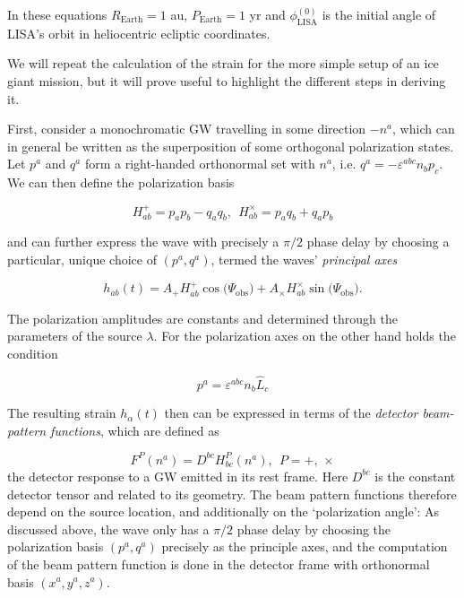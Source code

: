 \documentclass{aa}
\begin{document}
In these equations $R_\mathrm{Earth}=1$ au, $P_\mathrm{Earth} = 1$ yr and $\phi_{\mathrm{LISA}}^{(0)}$ is the initial angle of LISA's orbit in heliocentric ecliptic coordinates.

We will repeat the calculation of the strain for the more simple setup of an ice giant mission, but it will prove useful to highlight the different steps in deriving it.

First, consider a monochromatic GW travelling in some direction $-n^a$, which can in general be written as the superposition of some orthogonal polarization states. Let $p^a$ and $q^a$ form a right-handed orthonormal set with $n^a$, i.e. $q^a=-\varepsilon^{abc}n_bp_c$. We can then define the polarization basis 

\begin{equation} \label{eq:preGWtensor}
    H^+_{ab}=p_ap_b-q_aq_b,\ \ H^\times_{ab}=p_aq_b+q_ap_b
\end{equation}

and can further express the wave with precisely a $\pi/2$ phase delay by choosing a particular, unique choice of $(p^a,q^a)$, termed the waves' \textit{principal axes}

\begin{equation} \label{eq:GWtensor}
    h_{ab}(t)=A_+H_{ab}^+\cos \big(\Psi_\mathrm{obs} \big) + A_\times H_{ab}^\times \sin \big(\Psi_\mathrm{obs}\big).
\end{equation}

The polarization amplitudes are constants and determined through the parameters of the source $\lambda$. For the polarization axes on the other hand holds the condition

\begin{equation}
    p^a = \varepsilon^{abc}n_b\hat{L}_c
\end{equation}

The resulting strain $h_\alpha(t)$ then can be expressed in terms of the \textit{detector beam-pattern functions}, which are defined as

\begin{equation} \label{eq:beampattern}
    F^P(n^a) = D^{bc}H^P_{bc}(n^a), \ \ P=+,\, \times
\end{equation}    
the detector response to a GW emitted in its rest frame. Here $D^{bc}$ is the constant detector tensor and related to its geometry. The beam pattern functions therefore depend on the source location, and additionally on the `polarization angle': As discussed above, the wave only has a $\pi/2$ phase delay by choosing the polarization basis $(p^a,q^a)$ precisely as the principle axes, and the computation of the beam pattern function is done in the detector frame with orthonormal basis $(x^a,y^a,z^a)$. 
\end{document}
